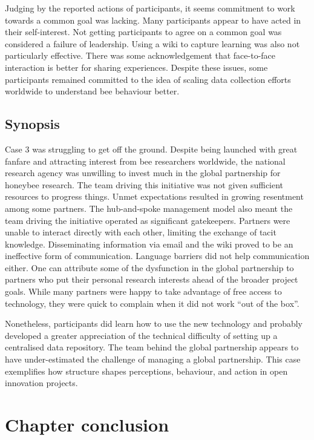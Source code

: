 Judging by the reported actions of participants, it seems commitment to work towards a common goal was lacking. Many participants appear to have acted in their self-interest. Not getting participants to agree on a common goal was considered a failure of leadership. Using a wiki to capture learning was also not particularly effective. There was some acknowledgement that face-to-face interaction is better for sharing experiences. Despite these issues, some participants remained committed to the idea of scaling data collection efforts worldwide to understand bee behaviour better.

\subsection{Synopsis}

Case 3 was struggling to get off the ground. Despite being launched with great fanfare and attracting interest from bee researchers worldwide, the national research agency was unwilling to invest much in the global partnership for honeybee research. The team driving this initiative was not given sufficient resources to progress things. Unmet expectations resulted in growing resentment among some partners. The hub-and-spoke management model also meant the team driving the initiative operated as significant gatekeepers. Partners were unable to interact directly with each other, limiting the exchange of tacit knowledge. Disseminating information via email and the wiki proved to be an ineffective form of communication. Language barriers did not help communication either. One can attribute some of the dysfunction in the global partnership to partners who put their personal research interests ahead of the broader project goals. While many partners were happy to take advantage of free access to technology, they were quick to complain when it did not work \enquote{out of the box}. \medskip

Nonetheless, participants did learn how to use the new technology and probably developed a greater appreciation of the technical difficulty of setting up a centralised data repository. The team behind the global partnership appears to have under-estimated the challenge of managing a global partnership. This case exemplifies how structure shapes perceptions, behaviour, and action in open innovation projects. 

\section{Chapter conclusion}

